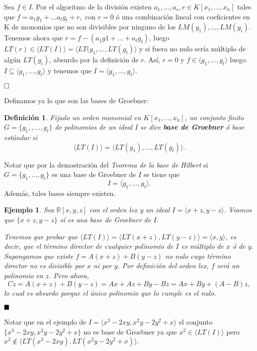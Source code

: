 \documentclass[12pt]{article}
\newtheorem{definition}[theorem]{Definición}
\newtheorem{example}{Ejemplo}[theorem]
\begin{document}
Sea $f \in I$. Por el algoritmo de la división existen $a_1, \ldots, a_s, r \in K[x_1, \ldots, x_n]$ tales que $f = a_1g_1+\ldots a_tg_t+r,$ con $r=0$ ó una combinación lineal con coeficientes en K de monomios que no son divisibles por ninguno de los $LM(g_1),\ldots,  LM(g_t)$. Tenemos ahora que $r = f-(a_1g1+\ldots+a_tg_t)$, luego $LT(r) \in \langle LT(I) \rangle = \langle LT(g_1, \ldots, LT(g_t) \rangle$ y si fuera no nulo sería múltiplo de algún $LT(g_i)$, absurdo por la definición de $r$. Así, $r=0$ y $f\in \langle g_1, \ldots, g_t \rangle$ luego $I \subseteq \langle g_1, \ldots, g_t \rangle$ y tenemos que $I = \langle g_1, \ldots, g_t \rangle$.

$\hfill \square$

Definamos ya lo que son las bases de Groebner:

\begin{definition}Fijado un orden monomial en $K[x_1, \ldots, x_n]$, un conjunto finito $G = \lbrace g_1,, \ldots, g_t \rbrace$ de polinomios de un ideal $I$ se dice \textbf{base de Groebner} ó base estándar si $$\langle LT(I) \rangle = \langle LT(g_1), \ldots, LT(g_t) \rangle.$$
\end{definition}

Notar que por la demostración del \textit{Teorema de la base de Hilbert} si $G = \lbrace g_1, \ldots, g_t \rbrace$ es una base de Groebner de $I$ se tiene que $$ I = \langle g_1, \ldots, g_t \rangle.$$ Además, tales bases siempre existen.

\begin{example}Sea $\mathbb{R}[x,y,z]$ con el orden lex y un ideal $I = \langle x+z, y-z \rangle$. Veamos que $\lbrace x+z, y-z \rbrace$ sí es una base de Groebner de $I$.

Tenemos que probar que $\langle LT(I) \rangle = \langle LT(x+z), LT(y-z) \rangle = \langle x,y \rangle$, es decir, que el término director de cualquier polinomio de $I$ es múltiplo de $x$ ó de $y$. Supongamos que existe $f = A(x+z) + B(y-z)$ no nulo cuyo término director no es divisible por $x$ ni por $y$. Por definición del orden lex, $f$ será un polinomio en $z$. Pero ahora, $$Cz = A(x+z) + B(y-z) = Ax + Az + By -Bz = Ax+By + (A-B)z,$$ lo cual es absurdo porque el único polinomio que lo cumple es el nulo.
\end{example}
$\hfill \blacksquare$

Notar que en el ejemplo de $I = \langle x^3-2xy, x^2y-2y^2+x \rangle$ el conjunto $\lbrace x^3-2xy, x^2y-2y^2+x \rbrace$ no es base de Groebner ya que $x^2 \in \langle LT(I) \rangle$ pero $x^2 \notin \langle LT(x^3-2xy), LT(x^2y-2y^2+x) \rangle.$
\end{document}
